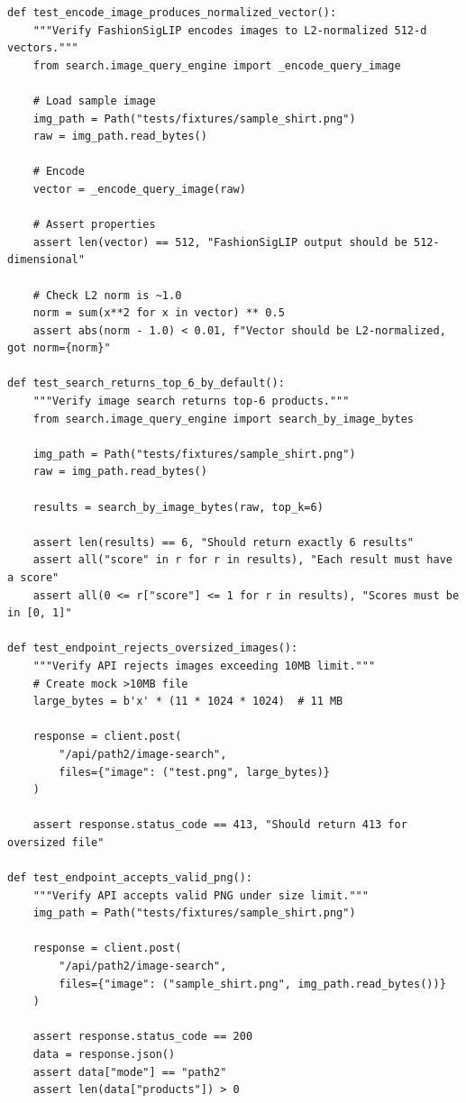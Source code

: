 \documentclass[12pt, twoside]{report}
\begin{document}
\begin{lstlisting}[caption={PATH 2 Test Suite --- tests/test\_image\_search.py}]
def test_encode_image_produces_normalized_vector():
    """Verify FashionSigLIP encodes images to L2-normalized 512-d vectors."""
    from search.image_query_engine import _encode_query_image
    
    # Load sample image
    img_path = Path("tests/fixtures/sample_shirt.png")
    raw = img_path.read_bytes()
    
    # Encode
    vector = _encode_query_image(raw)
    
    # Assert properties
    assert len(vector) == 512, "FashionSigLIP output should be 512-dimensional"
    
    # Check L2 norm is ~1.0
    norm = sum(x**2 for x in vector) ** 0.5
    assert abs(norm - 1.0) < 0.01, f"Vector should be L2-normalized, got norm={norm}"

def test_search_returns_top_6_by_default():
    """Verify image search returns top-6 products."""
    from search.image_query_engine import search_by_image_bytes
    
    img_path = Path("tests/fixtures/sample_shirt.png")
    raw = img_path.read_bytes()
    
    results = search_by_image_bytes(raw, top_k=6)
    
    assert len(results) == 6, "Should return exactly 6 results"
    assert all("score" in r for r in results), "Each result must have a score"
    assert all(0 <= r["score"] <= 1 for r in results), "Scores must be in [0, 1]"

def test_endpoint_rejects_oversized_images():
    """Verify API rejects images exceeding 10MB limit."""
    # Create mock >10MB file
    large_bytes = b'x' * (11 * 1024 * 1024)  # 11 MB
    
    response = client.post(
        "/api/path2/image-search",
        files={"image": ("test.png", large_bytes)}
    )
    
    assert response.status_code == 413, "Should return 413 for oversized file"

def test_endpoint_accepts_valid_png():
    """Verify API accepts valid PNG under size limit."""
    img_path = Path("tests/fixtures/sample_shirt.png")
    
    response = client.post(
        "/api/path2/image-search",
        files={"image": ("sample_shirt.png", img_path.read_bytes())}
    )
    
    assert response.status_code == 200
    data = response.json()
    assert data["mode"] == "path2"
    assert len(data["products"]) > 0
\end{lstlisting}
\end{document}
